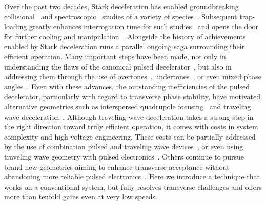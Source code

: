 \documentclass[%
 reprint,
 amsmath,amssymb,
 aps,
prl,
]{revtex4-1}
\begin{document}
Over the past two decades, Stark deceleration has enabled groundbreaking collisional~\cite{Sawyer2011,Kirste2012,Gao2018} and spectroscopic~\cite{Veldhoven2004,Hudson2006,Lev2006,Fast2018} studies of a variety of species~\cite{VanDeMeerakker2012}. 
Subsequent trap-loading greatly enhances interrogation time for such studies~\cite{Sawyer2008} and opens the door for further cooling and manipulation~\cite{Stuhl2012evap, Reens2017}. 
Alongside the history of achievements enabled by Stark deceleration runs a parallel ongoing saga surrounding their efficient operation. 
Many important steps have been made, not only in understanding the flaws of the canonical pulsed decelerator~\cite{VanDeMeerakker2006,Sawyer2008a}, but also in addressing them through the use of overtones~\cite{VanDeMeerakker2005a,Scharfenberg2009}, undertones~\cite{Zhang2016}, or even mixed phase angles~\cite{Parazzoli2009,Hou2013}. 
Even with these advances, the outstanding inefficiencies of the pulsed decelerator, particularly with regard to transverse phase stability, have motivated alternative geometries such as interspersed quadrupole focusing~\cite{Sawyer2008a} and traveling wave deceleration~\cite{Osterwalder2010,VandenBerg2014,Fabrikant2014}. 
Although traveling wave deceleration takes a strong step in the right direction toward truly efficient operation, it comes with costs in system complexity and high voltage engineering. 
These costs can be partially addressed by the use of combination pulsed and traveling wave devices~\cite{Quintero-Perez2013}, or even using traveling wave geometry with pulsed electronics~\cite{Shyur2017}. 
Others continue to pursue brand new geometries aiming to enhance transverse acceptance without abandoning more reliable pulsed electronics~\cite{Wang2016}. 
Here we introduce a technique that works on a conventional system, but fully resolves transverse challenges and offers more than tenfold gains even at very low speeds.
\end{document}
